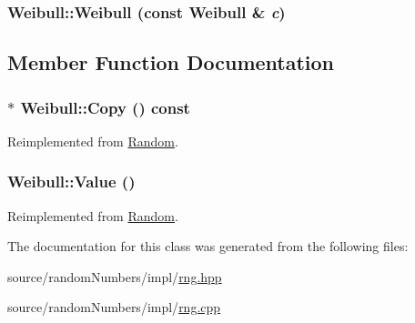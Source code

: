 \hypertarget{classWeibull_e61f13f2e95121364019b9e542847129}{
\subsubsection[{Weibull}]{\setlength{\rightskip}{0pt plus 5cm}Weibull::Weibull (const {\bf Weibull} \& {\em c})}}
\label{classWeibull_e61f13f2e95121364019b9e542847129}




\subsection{Member Function Documentation}
\hypertarget{classWeibull_2a82af828e7ba08035de1d326f714afa}{
\subsubsection[{Copy}]{ $\ast$ Weibull::Copy () const}}
\label{classWeibull_2a82af828e7ba08035de1d326f714afa}




Reimplemented from \hyperlink{classRandom_22b2951acd2008e8ff58fae434ab7ac5}{Random}.\hypertarget{classWeibull_1c4aeb6b0efae805a5ae36b072a8f4c6}{
\subsubsection[{Value}]{ Weibull::Value ()}}
\label{classWeibull_1c4aeb6b0efae805a5ae36b072a8f4c6}




Reimplemented from \hyperlink{classRandom_4d1c2876c5c78104186e241209d0e11e}{Random}.

The documentation for this class was generated from the following files:\begin{CompactItemize}
\item 
source/randomNumbers/impl/\hyperlink{rng_8hpp}{rng.hpp}\item 
source/randomNumbers/impl/\hyperlink{rng_8cpp}{rng.cpp}\end{CompactItemize}
